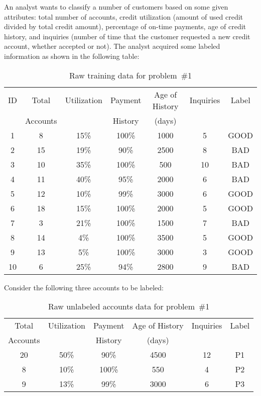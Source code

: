 \newcommand{\featureOp}{normalized}

\begin{problem}
An analyst wants to classify a number of customers based on some given attributes: total number of accounts, credit utilization (amount of used credit divided by total credit amount), percentage of on-time payments, age of credit history, and inquiries (number of time that the customer requested a new credit account, whether accepted or not). The analyst acquired some labeled information as shown in the following table:

\begin{table}[h]
  \centering
  \caption{Raw training data for problem~\#1}\label{tab:P01:RawTrain}
  \begin{tabular}{|c||c|c|c|c|c|c|}
    \hline
    ID & Total    & Utilization & Payment & Age of History & Inquiries & Label \\
       & Accounts &             & History & (days)         &           & \\\hline\hline
    1 & 8 & 15\% & 100\% & 1000 & 5 & GOOD \\\hline
    2 & 15 & 19\% & 90\% & 2500 & 8 & BAD \\\hline
    3 & 10 & 35\% & 100\% & 500 & 10 & BAD \\\hline
    4 & 11 & 40\% & 95\% & 2000 & 6 & BAD \\\hline
    5 & 12 & 10\% & 99\% & 3000 & 6 & GOOD \\\hline
    6 & 18 & 15\% & 100\% & 2000 & 5 & GOOD \\\hline
    7 & 3 & 21\% & 100\% & 1500 & 7 & BAD \\\hline
    8 & 14 & 4\% & 100\% & 3500 & 5 & GOOD \\\hline
    9 & 13 & 5\% & 100\% & 3000 & 3 & GOOD \\\hline
    10 & 6 & 25\% & 94\% & 2800 & 9 & BAD \\\hline
  \end{tabular}
\end{table}


Consider the following three accounts to be labeled:

\begin{table}[h]
  \centering
  \caption{Raw unlabeled accounts data for problem~\#1}\label{tab:P01:RawUnlabel}
  \begin{tabular}{|c|c|c|c|c|c|}
    \hline
    Total    & Utilization & Payment & Age of History & Inquiries & Label \\
    Accounts &             & History & (days)         &           & \\\hline\hline
    20 & 50\% & 90\% & 4500 & 12 & P1 \\\hline
    8 & 10\% & 100\% & 550 & 4 & P2 \\\hline
    9 & 13\% & 99\% & 3000 & 6 & P3 \\\hline
  \end{tabular}
\end{table}
\end{problem}

